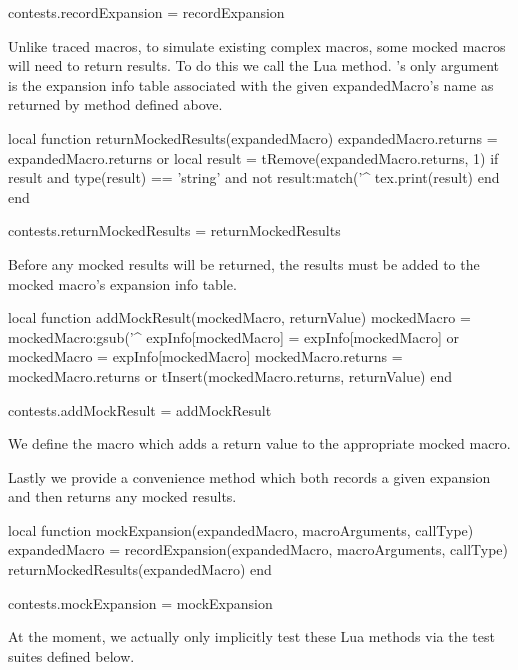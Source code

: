 contests.recordExpansion = recordExpansion
\stopLuaCode

Unlike traced macros, to simulate existing complex macros, some mocked 
macros will need to return  results. To do this we call the 
 Lua method. 's only 
argument is the expansion info table associated with the given 
expandedMacro's name as returned by  method defined 
above. 

\startLuaCode
local function returnMockedResults(expandedMacro)
  expandedMacro.returns = expandedMacro.returns or { }
  local result = tRemove(expandedMacro.returns, 1)
  if result and 
     type(result) == 'string' and
     not result:match('^%
    tex.print(result)
  end
end

contests.returnMockedResults = returnMockedResults
\stopLuaCode

Before any mocked results will be returned, the  results 
must be added to the mocked macro's expansion info table. 

\startLuaCode
local function addMockResult(mockedMacro, returnValue)
  mockedMacro = mockedMacro:gsub('^%
  expInfo[mockedMacro] = expInfo[mockedMacro] or { }
  mockedMacro          = expInfo[mockedMacro]
  mockedMacro.returns  = mockedMacro.returns or { }
  tInsert(mockedMacro.returns, returnValue)
end

contests.addMockResult = addMockResult
\stopLuaCode

We define the \type{\addMockResult} macro which adds a return 
value to the appropriate mocked macro. 

\startMkIVCode
\def\addMockResult#1#2{%
  \directlua{%
    thirddata.contests.addMockResult('#1', '#2')
  }
}
\stopMkIVCode

Lastly we provide a convenience method which both records a given 
expansion and then returns any mocked results. 

\startLuaCode
local function mockExpansion(expandedMacro,
                               macroArguments,
                               callType)
  expandedMacro = recordExpansion(expandedMacro,
                               macroArguments,
                               callType)
  returnMockedResults(expandedMacro)
end

contests.mockExpansion = mockExpansion
\stopLuaCode

At the moment, we actually only implicitly test these Lua methods via the 
test suites defined below. 

